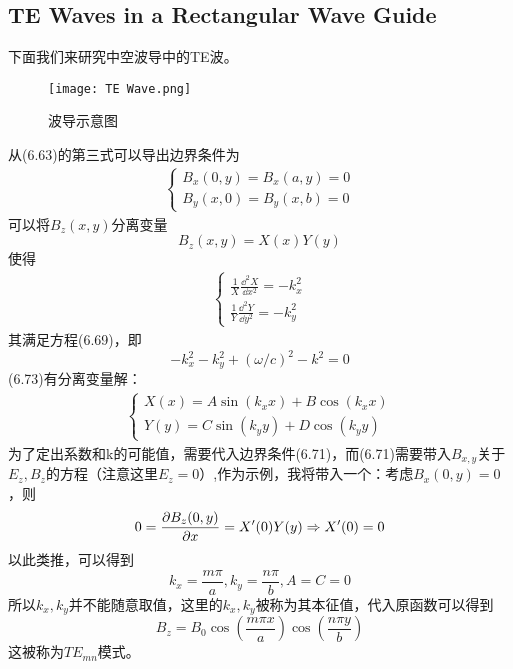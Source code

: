 \documentclass[14pt,oneside]{book}
\begin{document}
\begin{large}
\subsection{TE Waves in a Rectangular Wave Guide}
下面我们来研究中空波导中的TE波。
\begin{figure}[H]
\centering
  \texttt{[image: TE Wave.png]}
  \caption{波导示意图}
\end{figure}
从(6.63)的第三式可以导出边界条件为
\begin{align}
	\begin{cases}
		B_x(0,y)=B_x(a,y)=0\\
		B_y(x,0)=B_y(x,b)=0
	\end{cases}
\end{align}
可以将$B_z(x,y)$分离变量
\begin{equation}
  B_z(x,y)=X(x)Y(y)
\end{equation}
使得
\begin{align}
\begin{cases}
	\frac{1}{X} \frac{\dd^2 X}{\dd x^2}=-k_x^2\\
	\frac{1}{Y} \frac{\dd^2 Y}{\dd y^2}=-k_y^2
\end{cases}
\end{align}
其满足方程(6.69)，即
\begin{equation}
-k_x^2-k_y^2+(\omega / c)^2-k^2=0
\end{equation}
(6.73)有分离变量解：
\begin{align}
\begin{cases}
X(x)=A \sin \left(k_x x\right)+B \cos \left(k_x x\right)\\
Y(y)=C \sin \left(k_y y\right)+D \cos \left(k_y y\right)
\end{cases}
\end{align}
为了定出系数和k的可能值，需要代入边界条件(6.71)，而(6.71)需要带入$B_{x,y}$关于$E_{z},B_{z}$的方程（注意这里$E_{z}=0$）,作为示例，我将带入一个：考虑$B_x(0,y)=0$，则
\begin{equation}
  0=\pdv{B_z(0,y)}{x}=X'(0)Y(y)\Rightarrow X'(0)=0
\end{equation}
以此类推，可以得到
\begin{equation}
k_x=\frac{m \pi}{a},k_y=\frac{n \pi }{b}, A=C=0
\end{equation}
所以$k_x,k_y$并不能随意取值，这里的$k_x,k_y$被称为其本征值，代入原函数可以得到
\begin{equation}
B_z=B_0 \cos (\frac{m \pi x}{a}) \cos (\frac{n \pi y}{b})
\end{equation}
这被称为$TE_{mn}$模式。

\end{large}
\end{document}
